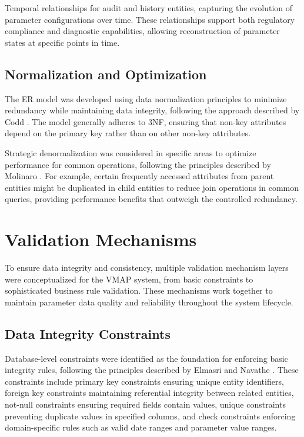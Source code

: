 Temporal relationships for audit and history entities, capturing the evolution of parameter configurations over time. These relationships support both regulatory compliance and diagnostic capabilities, allowing reconstruction of parameter states at specific points in time.

\subsection{Normalization and Optimization}
\label{subsec:normalization-optimization}

The \ac{ER} model was developed using data normalization principles to minimize redundancy while maintaining data integrity, following the approach described by Codd \cite{codd1970relational}. The model generally adheres to \ac{3NF}, ensuring that non-key attributes depend on the primary key rather than on other non-key attributes.

Strategic denormalization was considered in specific areas to optimize performance for common operations, following the principles described by Molinaro \cite{molinaro2005sql}. For example, certain frequently accessed attributes from parent entities might be duplicated in child entities to reduce join operations in common queries, providing performance benefits that outweigh the controlled redundancy.

\section{Validation Mechanisms}
\label{sec:validation-mechanisms}

To ensure data integrity and consistency, multiple validation mechanism layers were conceptualized for the \ac{VMAP} system, from basic constraints to sophisticated business rule validation. These mechanisms work together to maintain parameter data quality and reliability throughout the system lifecycle.

\subsection{Data Integrity Constraints}
\label{subsec:data-integrity-constraints}

Database-level constraints were identified as the foundation for enforcing basic integrity rules, following the principles described by Elmasri and Navathe \cite{elmasri2015fundamentals}. These constraints include primary key constraints ensuring unique entity identifiers, foreign key constraints maintaining referential integrity between related entities, not-null constraints ensuring required fields contain values, unique constraints preventing duplicate values in specified columns, and check constraints enforcing domain-specific rules such as valid date ranges and parameter value ranges.

